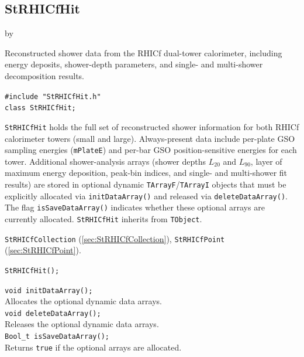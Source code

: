 \documentclass[twoside]{article}
\newcommand{\entrylabel}[1]{\mbox{\textbf{{#1}}}\hfil}%
\newenvironment{entry}
{\begin{list}{}%
    {\renewcommand{\makelabel}{\entrylabel}%
     \setlength{\labelwidth}{90pt}%
     \setlength{\leftmargin}{\labelwidth}
     \advance\leftmargin by \labelsep%
      }%
    }%
  {\end{list}}
\newcommand{\Entrylabel}[1]%
{\raisebox{0pt}[1ex][0pt]{\makebox[\labelwidth][l]%
    {\parbox[t]{\labelwidth}{\hspace{0pt}\textbf{{#1}}}}}}
\newenvironment{Entry}%
{\renewcommand{\entrylabel}{\Entrylabel}\begin{entry}}%
  {\end{entry}}
\begin{document}
\subsection{StRHICfHit}
\label{sec:StRHICfHit}
\begin{Entry}
\item[Summary] Reconstructed shower data from the RHICf dual-tower calorimeter,
    including energy deposits, shower-depth parameters, and single- and
    multi-shower decomposition results.
\item[Synopsis]
    \verb+#include "StRHICfHit.h"+\\
    \verb+class StRHICfHit;+\\
\item[Description]
    \texttt{StRHICfHit} holds the full set of reconstructed shower information
    for both RHICf calorimeter towers (small and large).  Always-present data
    include per-plate GSO sampling energies (\texttt{mPlateE}) and per-bar
    GSO position-sensitive energies for each tower.  Additional shower-analysis
    arrays (shower depths $L_{20}$ and $L_{90}$, layer of maximum energy
    deposition, peak-bin indices, and single- and multi-shower fit results) are
    stored in optional dynamic \texttt{TArrayF}/\texttt{TArrayI} objects that
    must be explicitly allocated via \texttt{initDataArray()} and released via
    \texttt{deleteDataArray()}.  The flag \texttt{isSaveDataArray()} indicates
    whether these optional arrays are currently allocated.
    \texttt{StRHICfHit} inherits from \texttt{TObject}.
\item[Related Classes]
    \texttt{StRHICfCollection} (\ref{sec:StRHICfCollection}),
    \texttt{StRHICfPoint} (\ref{sec:StRHICfPoint}).
\item[Public\\ Constructors]
    \verb+StRHICfHit();+\\
\item[Public Member\\ Functions]
    \verb+void initDataArray();+\\
    Allocates the optional dynamic data arrays.\\
    \verb+void deleteDataArray();+\\
    Releases the optional dynamic data arrays.\\
    \verb+Bool_t isSaveDataArray();+\\
    Returns \texttt{true} if the optional arrays are allocated.\\

\end{Entry}
\end{document}
